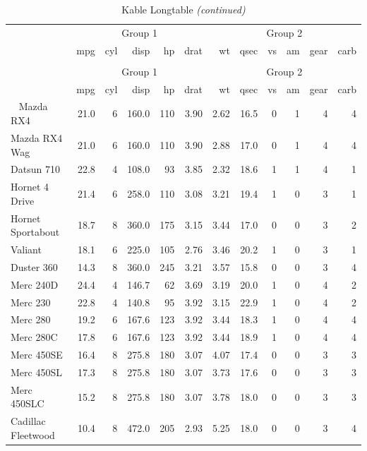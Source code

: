 \documentclass[]{book}
\begin{document}
\begin{longtable}{lrrrrrrrrrrr}
\caption{\label{tab:kable2}Kable Longtable}\\
\toprule
\multicolumn{1}{c}{ } & \multicolumn{5}{c}{Group 1} & \multicolumn{6}{c}{Group 2} \\
\cmidrule(l{2pt}r{2pt}){2-6} \cmidrule(l{2pt}r{2pt}){7-12}
  & mpg & cyl & disp & hp & drat & wt & qsec & vs & am & gear & carb\\
\midrule
\endfirsthead
\caption[]{\label{tab:kable2}Kable Longtable \textit{(continued)}}\\
\toprule
\multicolumn{1}{c}{ } & \multicolumn{5}{c}{Group 1} & \multicolumn{6}{c}{Group 2} \\
\cmidrule(l{2pt}r{2pt}){2-6} \cmidrule(l{2pt}r{2pt}){7-12}
  & mpg & cyl & disp & hp & drat & wt & qsec & vs & am & gear & carb\\
\midrule
\endhead
\
\endfoot
\bottomrule
\endlastfoot
Mazda RX4 & 21.0 & 6 & 160.0 & 110 & 3.90 & 2.62 & 16.5 & 0 & 1 & 4 & 4\\
Mazda RX4 Wag & 21.0 & 6 & 160.0 & 110 & 3.90 & 2.88 & 17.0 & 0 & 1 & 4 & 4\\
Datsun 710 & 22.8 & 4 & 108.0 & 93 & 3.85 & 2.32 & 18.6 & 1 & 1 & 4 & 1\\
Hornet 4 Drive & 21.4 & 6 & 258.0 & 110 & 3.08 & 3.21 & 19.4 & 1 & 0 & 3 & 1\\
Hornet Sportabout & 18.7 & 8 & 360.0 & 175 & 3.15 & 3.44 & 17.0 & 0 & 0 & 3 & 2\\
\addlinespace
Valiant & 18.1 & 6 & 225.0 & 105 & 2.76 & 3.46 & 20.2 & 1 & 0 & 3 & 1\\
Duster 360 & 14.3 & 8 & 360.0 & 245 & 3.21 & 3.57 & 15.8 & 0 & 0 & 3 & 4\\
Merc 240D & 24.4 & 4 & 146.7 & 62 & 3.69 & 3.19 & 20.0 & 1 & 0 & 4 & 2\\
Merc 230 & 22.8 & 4 & 140.8 & 95 & 3.92 & 3.15 & 22.9 & 1 & 0 & 4 & 2\\
Merc 280 & 19.2 & 6 & 167.6 & 123 & 3.92 & 3.44 & 18.3 & 1 & 0 & 4 & 4\\
\addlinespace
Merc 280C & 17.8 & 6 & 167.6 & 123 & 3.92 & 3.44 & 18.9 & 1 & 0 & 4 & 4\\
Merc 450SE & 16.4 & 8 & 275.8 & 180 & 3.07 & 4.07 & 17.4 & 0 & 0 & 3 & 3\\
Merc 450SL & 17.3 & 8 & 275.8 & 180 & 3.07 & 3.73 & 17.6 & 0 & 0 & 3 & 3\\
Merc 450SLC & 15.2 & 8 & 275.8 & 180 & 3.07 & 3.78 & 18.0 & 0 & 0 & 3 & 3\\
Cadillac Fleetwood & 10.4 & 8 & 472.0 & 205 & 2.93 & 5.25 & 18.0 & 0 & 0 & 3 & 4\\

\end{longtable}
\end{document}

